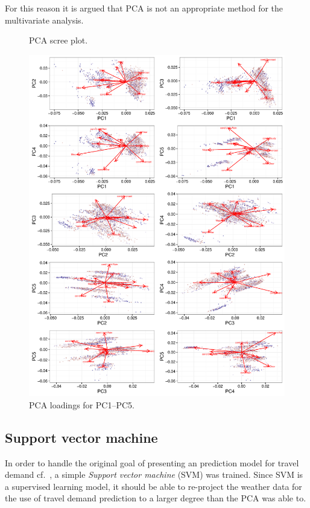 For this reason it is argued that PCA is not an appropriate method for the multivariate analysis.
\begin{figure}[!ht]
    \center
    
    \caption{PCA scree plot.}
    \label{fig:pca_screeplot}
\end{figure}

\begin{figure}[!p]
    \center
    \includegraphics[width=\textwidth]{../plots/pca_loadings}
    \caption{PCA loadings for PC1--PC5.}
    \label{fig:pca_loadings}
\end{figure}
\clearpage

\subsection{Support vector machine}
In order to handle the original goal of presenting an prediction model for travel demand cf.\ , a simple \emph{Support vector machine} (SVM) was trained. Since SVM is a supervised learning model, it should be able to re-project the weather data for the use of travel demand prediction to a larger degree than the PCA was able to.

